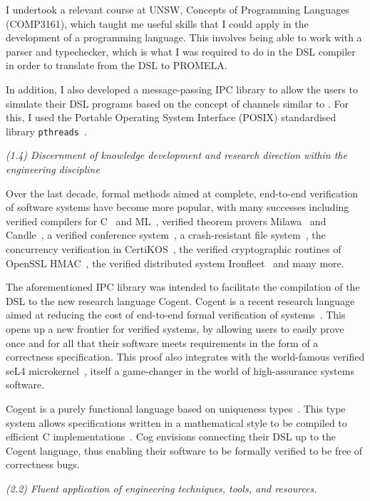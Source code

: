 \documentclass{report}
\begin{document}
I undertook a relevant course at UNSW, Concepts of Programming Languages (COMP3161), which taught me 
useful skills that I could apply in the development of a programming language. This involves being
able to work with a parser and typechecker, which is what I was required to do in the DSL compiler
in order to translate from the DSL to PROMELA.

In addition, I also developed a message-passing IPC library to allow the users to simulate their DSL
programs based on the concept of channels similar to \citet{Hoare}. For this, I used the Portable 
Operating System Interface (POSIX) standardised library \texttt{pthreads}~\citep{mueller}.

\textit{(1.4) Discernment of knowledge development and research direction within the engineering
discipline}

Over the last decade, formal methods aimed at complete, end-to-end verification of software 
systems have become more popular, with many successes including verified compilers for 
C~\citep{compcert} and ML~\citep{cakeml}, verified theorem provers Milawa~\citep{milawa} and 
Candle~\citep{candle}, a verified conference system~\citep{cocon}, a crash-resistant 
file system~\citep{fscq}, the concurrency verification in CertiKOS~\citep{certikos}, 
the verified cryptographic routines of OpenSSL HMAC~\citep{openssl}, the verified distributed 
system Ironfleet~\citep{ironfleet} and many more.

The aforementioned IPC library was intended to facilitate the compilation of the DSL to the 
new research language Cogent. Cogent is a recent research language aimed at reducing the cost 
of end-to-end formal verification of systems~\citep{asplos}. This opens up a new frontier for 
verified systems, by allowing users to easily prove once and for all that their software meets requirements
in the form of a correctness specification. This proof also integrates with the world-famous 
verified seL4 microkernel~\citep{sel4}, itself a game-changer in the world of high-assurance systems software.

Cogent is a purely functional language based on uniqueness types~\citep{liam}. This type system 
allows specifications written in a mathematical style to be compiled to efficient C implementations~\citep{wadler}.
Cog envisions connecting their DSL up to the Cogent language, thus enabling their software to be 
formally verified to be free of correctness bugs.


\textit{(2.2) Fluent application of engineering techniques, tools, and resources.}
\end{document}

